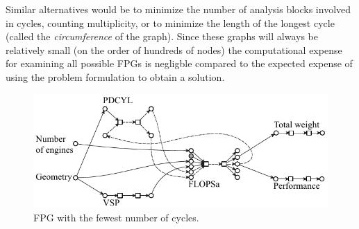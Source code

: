 	Similar alternatives would be to minimize the number of analysis blocks involved in cycles, counting multiplicity, or to minimize the length of the longest cycle (called the \emph{circumference} of the graph). Since these graphs will always be relatively small (on the order of hundreds of nodes) the 
	computational expense for examining all possible FPGs is negligble compared to the expected expense of using the problem formulation to obtain a solution.
	\begin{figure}[htb!]
	  \begin{center}
		\includegraphics[width=4.5in]{images/FPG_edit_fewest_cycles}
	  \end{center}
	  \caption{FPG with the fewest number of cycles.}
	\label{f:FPG fewest cycles}
	\end{figure}

